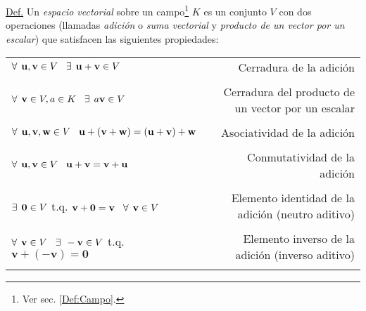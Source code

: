 \documentclass[12pt,dvipsnames]{article}
\begin{document}
\begin{tcolorbox} \label{Def:Espacio_vectorial}
\underline{Def.} Un \textit{espacio vectorial} sobre un campo\footnote{Ver sec. \ref{Def:Campo}.} $K$ es un conjunto $V$ con dos operaciones (llamadas \textit{adición} o \textit{suma vectorial} y \textit{producto de un vector por un escalar}) que satisfacen las siguientes propiedades:

\begin{center}
\begin{tabular}{lr}
    $\forall\hspace{1.5mm} \mathbf{u},\mathbf{v}\in V \hspace{3mm}\exists \hspace{1.5mm} \mathbf{u}+\mathbf{v}\in V$ & Cerradura de la adición \\ \\ \multirow{2}{0.4\textwidth}{$\forall\hspace{1.5mm} \mathbf{v}\in V, a\in K \hspace{3mm}\exists \hspace{1.5mm} a\mathbf{v}\in V$} & \multirow{2}{0.28\textwidth}{Cerradura del producto de un vector por un escalar} \\ \\ \\
    $\forall\hspace{1.5mm} \mathbf{u},\mathbf{v},\mathbf{w}\in V\hspace{3mm}\mathbf{u}+(\mathbf{v}+\mathbf{w})=(\mathbf{u}+\mathbf{v})+\mathbf{w}$  & Asociatividad de la adición\\ \\
    $\forall\hspace{1.5mm} \mathbf{u},\mathbf{v}\in V\hspace{3mm}\mathbf{u}+\mathbf{v}=\mathbf{v}+\mathbf{u}$ & Conmutatividad de la adición \\ \\
    $\exists \hspace{1.5mm} \mathbf{0}\in V$ t.q. $\mathbf{v}+\mathbf{0}=\mathbf{v}\hspace{3mm}\forall\hspace{1.5mm} \mathbf{v} \in V$ & Elemento identidad de la adición (neutro aditivo) \\ \\
    $\forall\hspace{1.5mm}\mathbf{v}\in V \hspace{3mm}\exists\hspace{1.5mm} -\mathbf{v}\in V$ t.q. $\mathbf{v}+(-\mathbf{v})=\mathbf{0}$ & Elemento inverso de la adición (inverso aditivo) \\ \\

\end{tabular}
\end{center}
\end{tcolorbox}
\end{document}
